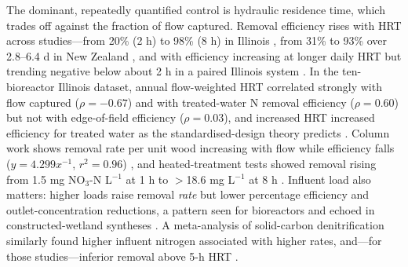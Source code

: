 The dominant, repeatedly quantified control is hydraulic residence time, which trades off against the fraction of flow captured. Removal efficiency rises with HRT across studies---from 20\% (2 h) to 98\% (8 h) in Illinois \parencite{Bell2015}, from 31\% to 93\% over 2.8--6.4 d in New Zealand \parencite{Rivas2020}, and with efficiency increasing at longer daily HRT but trending negative below about 2 h in a paired Illinois system \parencite{Maxwell2022}. In the ten-bioreactor Illinois dataset, annual flow-weighted HRT correlated strongly with flow captured ($\rho=-0.67$) and with treated-water N removal efficiency ($\rho=0.60$) but not with edge-of-field efficiency ($\rho=0.03$), and increased HRT increased efficiency for treated water as the standardised-design theory predicts \parencite{Christianson2026}. Column work shows removal rate per unit wood increasing with flow while efficiency falls ($y=4.299x^{-1}$, $r^2=0.96$) \parencite{Greenan2009}, and heated-treatment tests showed removal rising from 1.5 mg NO$_3$-N L$^{-1}$ at 1 h to $>$18.6 mg L$^{-1}$ at 8 h \parencite{Ma2021}. Influent load also matters: higher loads raise removal \emph{rate} but lower percentage efficiency and outlet-concentration reductions, a pattern seen for bioreactors \parencite{Rivas2020,Christianson2026} and echoed in constructed-wetland syntheses \parencite{Mendes2021}. A meta-analysis of solid-carbon denitrification similarly found higher influent nitrogen associated with higher rates, and---for those studies---inferior removal above 5-h HRT \parencite{Zhang2021b}.

